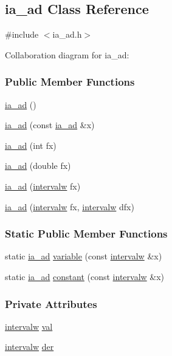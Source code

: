 \hypertarget{classia__ad}{\subsection{ia\-\_\-ad \-Class \-Reference}
\label{classia__ad}
}


{\ttfamily \#include $<$ia\-\_\-ad.\-h$>$}



\-Collaboration diagram for ia\-\_\-ad\-:
\subsubsection*{\-Public \-Member \-Functions}
\begin{DoxyCompactItemize}
\item 
\hyperlink{classia__ad_aa89357baca54f1704365508ae43fe008}{ia\-\_\-ad} ()
\item 
\hyperlink{classia__ad_a7287db090cf7c584a225b5660932e6fa}{ia\-\_\-ad} (const \hyperlink{classia__ad}{ia\-\_\-ad} \&x)
\item 
\hyperlink{classia__ad_a9b59d8fb3963661fdcf1e1788cb76cf5}{ia\-\_\-ad} (int fx)
\item 
\hyperlink{classia__ad_a99df5d6114c03789f19093157c8452e3}{ia\-\_\-ad} (double fx)
\item 
\hyperlink{classia__ad_a95a2087511196701b57c6dd95361f8ff}{ia\-\_\-ad} (\hyperlink{classintervalw}{intervalw} fx)
\item 
\hyperlink{classia__ad_ae8b3c4782a4f98879025ae4bf8139eca}{ia\-\_\-ad} (\hyperlink{classintervalw}{intervalw} fx, \hyperlink{classintervalw}{intervalw} dfx)
\end{DoxyCompactItemize}
\subsubsection*{\-Static \-Public \-Member \-Functions}
\begin{DoxyCompactItemize}
\item 
static \hyperlink{classia__ad}{ia\-\_\-ad} \hyperlink{classia__ad_a4b29351e6e75dabcdc06ea86a83d1212}{variable} (const \hyperlink{classintervalw}{intervalw} \&x)
\item 
static \hyperlink{classia__ad}{ia\-\_\-ad} \hyperlink{classia__ad_ab53845b4b249943f41efb83e1ae5fcd6}{constant} (const \hyperlink{classintervalw}{intervalw} \&x)
\end{DoxyCompactItemize}
\subsubsection*{\-Private \-Attributes}
\begin{DoxyCompactItemize}
\item 
\hyperlink{classintervalw}{intervalw} \hyperlink{classia__ad_aa78454951ab1a9f214867a7ecc2fcf27}{val}
\item 
\hyperlink{classintervalw}{intervalw} \hyperlink{classia__ad_a8a353e3ac60819fc7d4c55defa881a7f}{der}
\end{DoxyCompactItemize}
